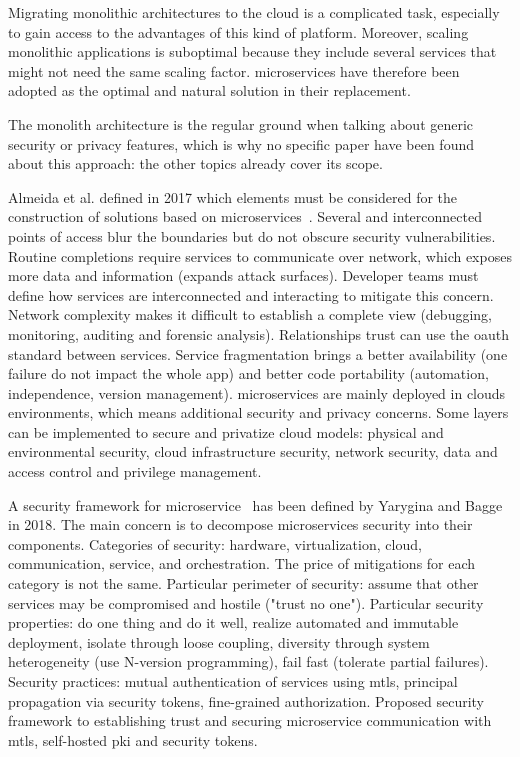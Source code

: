 Migrating monolithic architectures to the \gls{cloud} is a complicated task, especially to gain access to the advantages of this kind of platform. Moreover, scaling monolithic applications is suboptimal because they include several services that might not need the same scaling factor. \Glspl{microservice} have therefore been adopted as the optimal and natural solution in their replacement.

The monolith architecture is the regular ground when talking about generic security or privacy features, which is why no specific paper have been found about this approach: the other topics already cover its scope.

Almeida et al. defined in 2017 which elements must be considered for the construction of solutions based on \glspl{microservice}~\cite{almeida_survey_2017}. Several and interconnected points of access blur the boundaries but do not obscure security vulnerabilities. Routine completions require services to communicate over network, which exposes more data and information (expands attack surfaces). Developer teams must define how services are interconnected and interacting to mitigate this concern. Network complexity makes it difficult to establish a complete view (debugging, monitoring, auditing and forensic analysis). Relationships trust can use the \gls{oauth} standard between services. Service fragmentation brings a better availability (one failure do not impact the whole app) and better code portability (automation, independence, version management). \Glspl{microservice} are mainly deployed in \glspl{cloud} environments, which means additional security and privacy concerns. Some layers can be implemented to secure and privatize cloud models: physical and environmental security, cloud infrastructure security, network security, data and access control and privilege management. %

A security \gls{framework} for \gls{microservice}~\cite{yarygina_overcoming_2018} has been defined by Yarygina and Bagge in 2018. The main concern is to decompose \glspl{microservice} security into their components. Categories of security: hardware, virtualization, \gls{cloud}, communication, service, and orchestration. The price of mitigations for each category is not the same. Particular perimeter of security: assume that other services may be compromised and hostile ("trust no one"). Particular security properties: do one thing and do it well, realize automated and immutable deployment, isolate through loose coupling, diversity through system heterogeneity (use N-version programming), fail fast (tolerate partial failures). Security practices: mutual authentication of services using \gls{mtls}, principal propagation via security tokens, fine-grained authorization. Proposed security \gls{framework} to establishing trust and securing \gls{microservice} communication with \gls{mtls}, self-hosted \gls{pki} and security tokens. %

